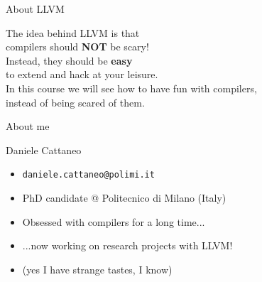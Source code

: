 \documentclass[10pt,mathserif]{beamer}
\begin{document}
\begin{frame}[t]{About LLVM}
  \begin{center}
  	\vfill
  	\large
  	The idea behind LLVM is that \\ compilers should \textbf{NOT} be scary! \\
		\bigskip
		Instead, they should be \textbf{easy} \\ to extend and hack at your leisure. \\
		\bigskip
		In this course we will see how to have fun with compilers, \\instead of being scared of them.
		\vfill
  \end{center}
\end{frame}

\begin{frame}[t]{About me}
  \begin{large}
  \begin{center}
    Daniele Cattaneo
  \end{center}
  \end{large}
  \vspace{0.5em}
  \begin{center}
  \begin{varwidth}{8cm}
    \begin{itemize}
    \item \texttt{daniele.cattaneo@polimi.it}
    \item PhD candidate @ Politecnico di Milano (Italy)
    \item Obsessed with compilers for a long time...
    \item ...now working on research projects with LLVM!
    \item (yes I have strange tastes, I know)
  \end{itemize}
  \end{varwidth}
  \end{center}
\end{frame}
\end{document}
